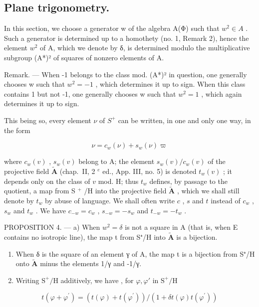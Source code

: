 \subsection{Plane trigonometry.}

In this section, we choose a generator w of the algebra A(Φ) such that \(w^{2} \in A\) . Such a generator is determined up to a homothety (no. 1, Remark 2), hence the element \(w^{2}\) of A, which we denote by δ, is determined modulo the multiplicative subgroup (A*)² of squares of nonzero elements of A.

Remark. — When -1 belongs to the class mod. (A*)² in question, one generally chooses w such that \(w^{2} = -1\) , which determines it up to sign. When this class contains 1 but not -1, one generally chooses w such that \(w^{2} = 1\) , which again determines it up to sign.

This being so, every element \(\nu\) of \(S^{+}\) can be written, in one and only one way, in the form

\[
\nu = c _ {w} (\nu) + s _ {w} (\nu) \varpi\tag{1}
\]

where \(c_w(v)\) , \(s_w(v)\) belong to A; the element \(s_w(v)/c_w(v)\) of the projective field \(\tilde{\mathbf{A}}\) (chap.~II, 2 \(^{e}\) ed., App. III, no. 5) is denoted \(t_w(v)\) ; it depends only on the class of \(v\) mod. H; thus \(t_w\) defines, by passage to the quotient, a map from S \(^{+}\) /H into the projective field \(\tilde{\mathbf{A}}\) , which we shall still denote by \(t_w\) by abuse of language. We shall often write \(c\) , \(s\) and \(t\) instead of \(c_w\) , \(s_w\) and \(t_w\) . We have \(c_{-w} = c_w\) , \(s_{-w} = -s_w\) and \(t_{-w} = -t_w\) .

PROPOSITION 4. — a) When \(w^2 = \delta\) is not a square in A (that is, when E contains no isotropic line), the map t from S⁺/H into \(\tilde{\mathbf{A}}\) is a bijection.

\begin{enumerate}
\def\labelenumi{\alph{enumi})}
\setcounter{enumi}{1}
\item
  When δ is the square of an element γ of A, the map t is a bijection from S⁺/H onto \(\tilde{\mathbf{A}}\) minus the elements 1/γ and -1/γ.
\item
  Writing \(\mathrm{S}^{+}/\mathrm{H}\) additively, we have , for \(\varphi, \varphi'\) in \(\mathrm{S}^{+}/\mathrm{H}\)
\end{enumerate}

\[
t (\varphi + \varphi^ {\prime}) = (t (\varphi) + t (\varphi^ {\prime})) / (1 + \delta t (\varphi) t (\varphi^ {\prime}))\tag{2}
\]

